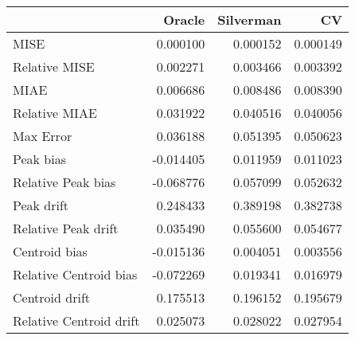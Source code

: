 \begin{tabular}{lrrr}
  \hline
 & Oracle & Silverman & CV \\ 
  \hline
MISE & 0.000100 & 0.000152 & 0.000149 \\ 
  Relative MISE & 0.002271 & 0.003466 & 0.003392 \\ 
  MIAE & 0.006686 & 0.008486 & 0.008390 \\ 
  Relative MIAE & 0.031922 & 0.040516 & 0.040056 \\ 
  Max Error & 0.036188 & 0.051395 & 0.050623 \\ 
  Peak bias & -0.014405 & 0.011959 & 0.011023 \\ 
  Relative Peak bias & -0.068776 & 0.057099 & 0.052632 \\ 
  Peak drift & 0.248433 & 0.389198 & 0.382738 \\ 
  Relative Peak drift & 0.035490 & 0.055600 & 0.054677 \\ 
  Centroid bias & -0.015136 & 0.004051 & 0.003556 \\ 
  Relative Centroid bias & -0.072269 & 0.019341 & 0.016979 \\ 
  Centroid drift & 0.175513 & 0.196152 & 0.195679 \\ 
  Relative Centroid drift & 0.025073 & 0.028022 & 0.027954 \\ 
   \hline
\end{tabular}

